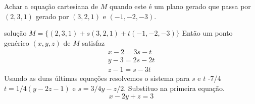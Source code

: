 \documentclass{beamer}
\begin{document}
\begin{frame}
  Achar a equação cartesiana de $M$ quando este é um plano gerado 
  que passa por $(2,3,1)$ gerado por $(3,2,1)$ e $(-1,-2,-3)$.

\end{frame}
\begin{frame}{solução} 
  $M=\{ (2,3,1)+s(3,2,1)+t(-1,-2,-3)\}$ Então um ponto genérico
   $(x,y,z)$ de $M$ satisfaz
  \begin{gather*}
    x-2 = 3s-t \\
    y-3 = 2s -2t \\
    z-1 = s-3t
  \end{gather*}
  Usando as duas últimas equações resolvemos o sistema 
  para $s$ e $t$ -7/4
  $t=1/4(y-2z-1)$ e $s=3/4y -z/2.$ Substituo na primeira equação.
  $$x-2y+z=3$$

\end{frame}

\begin{frame}
  
\end{frame}
\end{document}
